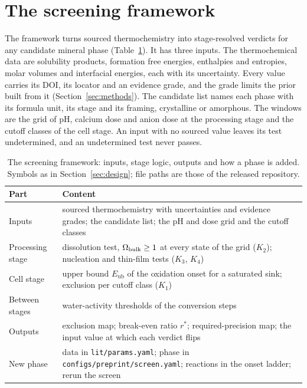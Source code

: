 \section{The screening framework}\label{sec:framework}

The framework turns sourced thermochemistry into stage-resolved verdicts for any candidate mineral phase (Table~\ref{tab:framework}). %
It has three inputs. %
The thermochemical data are solubility products, formation free energies, enthalpies and entropies, molar volumes and interfacial energies, each with its uncertainty. %
Every value carries its DOI, its locator and an evidence grade, and the grade limits the prior built from it (Section~\ref{sec:methods}). %
The candidate list names each phase with its formula unit, its stage and its framing, crystalline or amorphous. %
The windows are the grid of pH, calcium dose and anion dose at the processing stage and the cutoff classes of the cell stage. %
An input with no sourced value leaves its test undetermined, and an undetermined test never passes. %

\begin{table}[t]
\small
\caption{The screening framework: inputs, stage logic, outputs and how a phase is added. Symbols as in Section~\ref{sec:design}; file paths are those of the released repository.}
\label{tab:framework}
\begin{tabular*}{\columnwidth}{@{}>{\raggedright\arraybackslash}p{}>{\raggedright\arraybackslash}p{}@{}}
\hline
Part & Content\\
\hline
Inputs & sourced thermochemistry with uncertainties and evidence grades; the candidate list; the pH and dose grid and the cutoff classes\\
Processing stage & dissolution test, $\Omega_\mathrm{bulk}\ge1$ at every state of the grid ($K_2$); nucleation and thin-film tests ($K_3$, $K_4$)\\
Cell stage & upper bound $E_\mathrm{ub}$ of the oxidation onset for a saturated sink; exclusion per cutoff class ($K_1$)\\
Between stages & water-activity thresholds of the conversion steps\\
Outputs & exclusion map; break-even ratio $r^*$; required-precision map; the input value at which each verdict flips\\
New phase & data in \texttt{lit/params.yaml}; phase in \texttt{configs/preprint/screen.yaml}; reactions in the onset ladder; rerun the screen\\
\hline
\end{tabular*}
\end{table}

